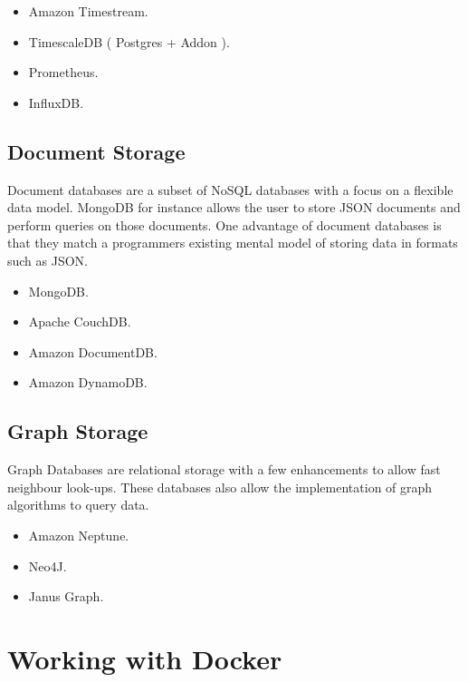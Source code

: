 \documentclass{csse4400}
\begin{document}
\begin{itemize}
  \item Amazon Timestream.
  \item TimescaleDB ( Postgres + Addon ).
  \item Prometheus.
  \item InfluxDB.
\end{itemize}

\subsection{Document Storage}

Document databases are a subset of NoSQL databases with a focus on a flexible data model.
MongoDB for instance allows the user to store JSON documents and perform queries on those documents.
One advantage of document databases is that they match a programmers existing mental model of storing data in formats such as JSON.

\begin{itemize}
  \item MongoDB.
  \item Apache CouchDB.
  \item Amazon DocumentDB.
  \item Amazon DynamoDB.
\end{itemize}

\subsection{Graph Storage}


Graph Databases are relational storage with a few enhancements to allow fast neighbour look-ups.
These databases also allow the implementation of graph algorithms to query data.

\begin{itemize}
  \item Amazon Neptune.
  \item Neo4J.
  \item Janus Graph.
\end{itemize}

\section{Working with Docker}
\end{document}
